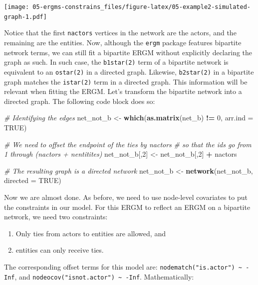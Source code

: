 \documentclass[]{book}
\newenvironment{Shaded}{\begin{snugshade}}{\end{snugshade}}
\newcommand{\CommentTok}[1]{\textcolor[rgb]{0.56,0.35,0.01}{\textit{#1}}}
\newcommand{\DataTypeTok}[1]{\textcolor[rgb]{0.13,0.29,0.53}{#1}}
\newcommand{\DecValTok}[1]{\textcolor[rgb]{0.00,0.00,0.81}{#1}}
\newcommand{\KeywordTok}[1]{\textcolor[rgb]{0.13,0.29,0.53}{\textbf{#1}}}
\newcommand{\NormalTok}[1]{#1}
\newcommand{\OperatorTok}[1]{\textcolor[rgb]{0.81,0.36,0.00}{\textbf{#1}}}
\newcommand{\OtherTok}[1]{\textcolor[rgb]{0.56,0.35,0.01}{#1}}
\newcommand{\StringTok}[1]{\textcolor[rgb]{0.31,0.60,0.02}{#1}}
\providecommand{\tightlist}{%
  \setlength{\itemsep}{0pt}\setlength{\parskip}{0pt}}
\begin{document}
\texttt{[image: 05-ergms-constrains\_files/figure-latex/05-example2-simulated-graph-1.pdf]}

Notice that the first \texttt{nactors} vertices in the network are the actors, and
the remaining are the entities. Now, although the \texttt{ergm} package features
bipartite network terms, we can still fit a bipartite ERGM without explicitly
declaring the graph as such. In such case, the \texttt{b1star(2)} term of a bipartite
network is equivalent to an \texttt{ostar(2)} in a directed graph. Likewise, \texttt{b2star(2)}
in a bipartite graph matches the \texttt{istar(2)} term in a directed graph. This
information will be relevant when fitting the ERGM. Let's transform the bipartite
network into a directed graph. The following code block does so:

\begin{Shaded}
\begin{Highlighting}[]
\CommentTok{# Identifying the edges}
\NormalTok{net_not_b <-}\StringTok{ }\KeywordTok{which}\NormalTok{(}\KeywordTok{as.matrix}\NormalTok{(net_b) }\OperatorTok{!=}\StringTok{ }\DecValTok{0}\NormalTok{, }\DataTypeTok{arr.ind =} \OtherTok{TRUE}\NormalTok{)}

\CommentTok{# We need to offset the endpoint of the ties by nactors}
\CommentTok{# so that the ids go from 1 through (nactors + nentitites)}
\NormalTok{net_not_b[,}\DecValTok{2}\NormalTok{] <-}\StringTok{ }\NormalTok{net_not_b[,}\DecValTok{2}\NormalTok{] }\OperatorTok{+}\StringTok{ }\NormalTok{nactors}

\CommentTok{# The resulting graph is a directed network}
\NormalTok{net_not_b <-}\StringTok{ }\KeywordTok{network}\NormalTok{(net_not_b, }\DataTypeTok{directed =} \OtherTok{TRUE}\NormalTok{)}
\end{Highlighting}
\end{Shaded}

Now we are almost done. As before, we need to use node-level covariates
to put the constraints in our model. For this ERGM to reflect an ERGM on
a bipartite network, we need two constraints:

\begin{enumerate}
\def\labelenumi{\arabic{enumi}.}
\tightlist
\item
  Only ties from actors to entities are allowed, and
\item
  entities can only receive ties.
\end{enumerate}

The corresponding offset terms for this model are: \texttt{nodematch("is.actor")\ \textasciitilde{}\ -Inf},
and \texttt{nodeocov("isnot.actor")\ \textasciitilde{}\ -Inf}. Mathematically:
\end{document}

